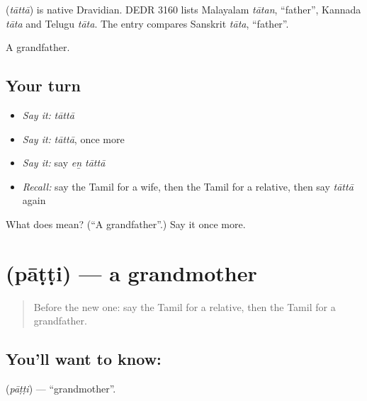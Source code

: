 \begin{cousinweb}
\textbf{} (\emph{tāttā}) is native Dravidian. DEDR 3160 lists Malayalam \emph{tātan}, \textquotedblleft{}father\textquotedblright{}, Kannada \emph{tāta} and Telugu \emph{tāta}. The entry compares Sanskrit \emph{tāta}, \textquotedblleft{}father\textquotedblright{}.
\end{cousinweb}

\begin{grammarlens}[title={What you've built}]
A grandfather.
\end{grammarlens}

\subsection*{Your turn}
\begin{itemize}
\raggedright
  \item \emph{Say it:} \emph{tāttā}
  \item \emph{Say it:} \emph{tāttā}, once more
  \item \emph{Say it:} say \emph{eṉ tāttā}
  \item \emph{Recall:} say the Tamil for a wife, then the Tamil for a relative, then say \emph{tāttā} again
\end{itemize}

\begin{tcolorbox}[breakable,colback=teal!4,colframe=teal!35!black,title={Before you move on}]
What does  mean? (\textquotedblleft{}A grandfather\textquotedblright{}.) Say it once more.
\end{tcolorbox}
\section[\texorpdfstring{\ta{பாட்டி} (pāṭṭi)}{பாட்டி (pāṭṭi)}]{ (pāṭṭi) — a grandmother}

\label{lesson:TA-C101-grandmother}



\begin{quote}
Before the new one: say the Tamil for a relative, then the Tamil for a grandfather.
\end{quote}

\subsection*{You'll want to know: }
\textbf{} (\emph{pāṭṭi}) — \textquotedblleft{}grandmother\textquotedblright{}.


